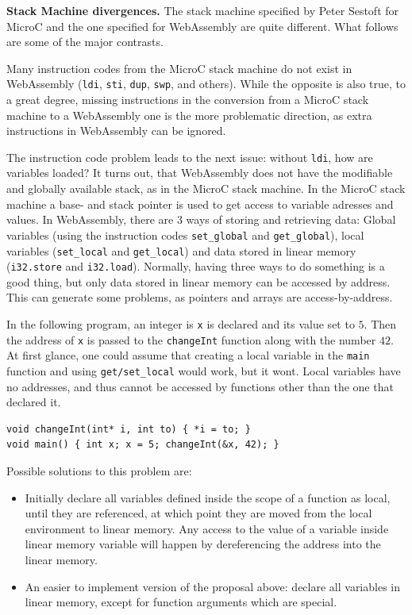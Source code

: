 \documentclass[a4paper]{article}
\begin{document}
\noindent \textbf{Stack Machine divergences.} The stack machine specified by Peter Sestoft for MicroC and the one specified for WebAssembly are quite different. What follows are some of the major contrasts.

Many instruction codes from the MicroC stack machine do not exist in WebAssembly (\texttt{ldi}, \texttt{sti}, \texttt{dup}, \texttt{swp}, and others). While the opposite is also true, to a great degree, missing instructions in the conversion from a MicroC stack machine to a WebAssembly one is the more problematic direction, as extra instructions in WebAssembly can be ignored.

The instruction code problem leads to the next issue: without \texttt{ldi}, how are variables loaded? It turns out, that WebAssembly does not have the modifiable and globally available stack, as in the MicroC stack machine. In the MicroC stack machine a base- and stack pointer is used to get access to variable adresses and values. In WebAssembly, there are 3 ways of storing and retrieving data: Global variables (using the instruction codes \texttt{set\_global} and \texttt{get\_global}), local variables (\texttt{set\_local} and \texttt{get\_local}) and data stored in linear memory (\texttt{i32.store} and \texttt{i32.load}). Normally, having three ways to do something is a good thing, but only data stored in linear memory can be accessed by address. This can generate some problems, as pointers and arrays are access-by-address.

In the following program, an integer is \texttt{x} is declared and its value set to $5$. Then the address of \texttt{x} is passed to the \texttt{changeInt} function along with the number $42$. At first glance, one could assume that creating a local variable in the \texttt{main} function and using \texttt{get/set\_local} would work, but it wont. Local variables have no addresses, and thus cannot be accessed by functions other than the one that declared it.
\begin{verbatim}
void changeInt(int* i, int to) { *i = to; }
void main() { int x; x = 5; changeInt(&x, 42); }
\end{verbatim}

Possible solutions to this problem are:
\begin{itemize}
	\item Initially declare all variables defined inside the scope of a function as local, until they are referenced, at which point they are moved from the local environment to linear memory. Any access to the value of a variable inside linear memory variable will happen by dereferencing the address into the linear memory.
	\item An easier to implement version of the proposal above: declare all variables in linear memory, except for function arguments which are special.
\end{itemize}
\end{document}

